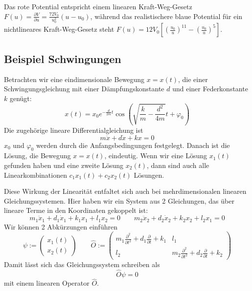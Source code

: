 \documentclass[12pt]{book}
\begin{document}
Das rote Potential entspricht einem linearen Kraft-Weg-Gesetz
$F(u) = \frac{\partial V}{\partial u} = \frac{72 V_0}{u_0^2}(u - u_0)$, während das realistischere
blaue Potential für ein nichtlineares Kraft-Weg-Gesetz steht
$F(u) = 12 V_0 [ (\frac{u_0}{u})^{11} - (\frac{u_0}{u})^5 ]$.

\subsection{Beispiel Schwingungen}

Betrachten wir eine eindimensionale Bewegung $x=x(t)$, die einer Schwingungsgleichung mit einer Dämpfungskonstante $d$ und einer Federkonstante $k$ genügt:
\begin{equation*} 
x(t)=x_0 e^{-\frac{d}{2m} t}\cos(\sqrt{ \frac{k}{m} - \frac{d^2}{4m} } t+ \varphi_0)\end{equation*}
Die zugehörige lineare Differentialgleichung ist 
\begin{equation*} 
m \ddot x + d \dot x + k x = 0
\end{equation*}
$x_0$ und $\varphi_0$ werden durch die Anfangsbedingungen festgelegt. Danach ist die Lösung, die Bewegung $x=x(t)$, eindeutig. Wenn wir eine Lösung $x_1(t)$ gefunden haben und eine zweite Lösung $x_2(t)$, dann sind auch alle Linearkombinationen $c_1 x_1(t)+ c_2 x_2(t)$ Lösungen.

Diese Wirkung der Linearität entfaltet sich auch bei mehrdimensionalen linearen Gleichungssystemen. Hier haben wir ein System aus 2 Gleichungen, das über lineare Terme in den Koordinaten gekoppelt ist:
\begin{equation*} 
m_1 \ddot x_1 + d_1 \dot x_1 + k_1 x_1 + l_1 x_2 = 0 \quad \quad m_2 \ddot x_2 + d_2 \dot x_2 + k_2 x_2 + l_2 x_1 = 0 
\end{equation*}
Wir können 2 Abkürzungen einführen
\begin{equation*} 
\psi := \begin{pmatrix} x_1(t) \\ x_2(t) \end{pmatrix} \quad \quad \hat{O} := \begin{pmatrix} m_1 \frac{\partial^2}{\partial t^2} + d_1 \frac{\partial}{\partial t} + k_1 & l_1 \\ l_2 & m_2 \frac{\partial^2}{\partial t^2} + d_2 \frac{\partial}{\partial t} + k_2 \end{pmatrix} 
\end{equation*}
Damit lässt sich das Gleichungssystem schreiben als
\begin{equation*} 
\hat{O} \psi = 0 
\end{equation*}
mit einem linearen Operator $\hat{O}$.
\end{document}
